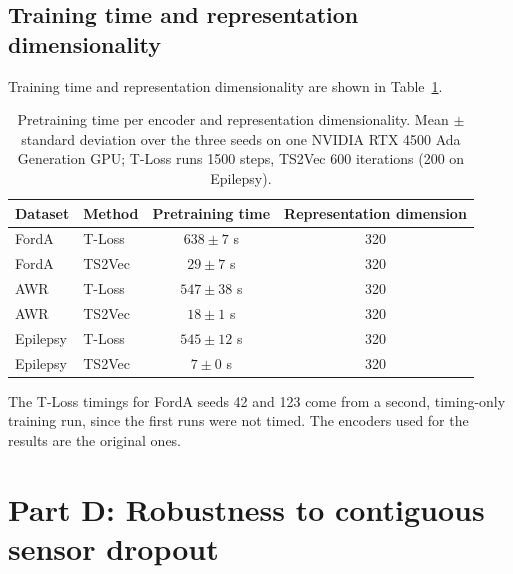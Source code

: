 \documentclass[a4paper,11pt]{article}
\begin{document}
\subsection{Training time and representation dimensionality}
Training time and representation dimensionality are shown in Table~\ref{tab:cost}.

\begin{table}[htbp]
    \centering
    \small
    \begin{tabular}{l l c c}
        \toprule
        Dataset & Method & Pretraining time & Representation dimension \\
        \midrule
        FordA & T-Loss & $638 \pm 7$ s & 320 \\
        FordA & TS2Vec & $29 \pm 7$ s & 320 \\
        AWR & T-Loss & $547 \pm 38$ s & 320 \\
        AWR & TS2Vec & $18 \pm 1$ s & 320 \\
        Epilepsy & T-Loss & $545 \pm 12$ s & 320 \\
        Epilepsy & TS2Vec & $7 \pm 0$ s & 320 \\
        \bottomrule
    \end{tabular}
    \caption{Pretraining time per encoder and representation dimensionality. Mean $\pm$ standard deviation over the three seeds on one NVIDIA RTX 4500 Ada Generation GPU; T-Loss runs 1500 steps, TS2Vec 600 iterations (200 on Epilepsy).}
    \label{tab:cost}
\end{table}

The T-Loss timings for FordA seeds 42 and 123 come from a second, timing-only training run, since the first runs were not timed. The encoders used for the results are the original ones.

\section{Part D: Robustness to contiguous sensor dropout}
\end{document}
